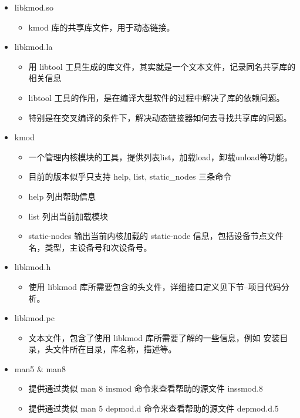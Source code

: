 \begin{itemize}
\item
  libkmod.so
  \begin{itemize}
  \item
    kmod 库的共享库文件，用于动态链接。
  \end{itemize}
\item
  libkmod.la
  \begin{itemize}
  \item
    用 libtool
    工具生成的库文件，其实就是一个文本文件，记录同名共享库的相关信息
  \item
    libtool 工具的作用，是在编译大型软件的过程中解决了库的依赖问题。
  \item
    特别是在交叉编译的条件下，解决动态链接器如何去寻找共享库的问题。
  \end{itemize}
\item
  kmod
  \begin{itemize}
  \item
    一个管理内核模块的工具，提供列表list，加载load，卸载unload等功能。
  \item
    目前的版本似乎只支持 help, list, static\_nodes 三条命令
  \item
    help 列出帮助信息
  \item
    list 列出当前加载模块
  \item
    static-nodes 输出当前内核加载的 static-node
    信息，包括设备节点文件名，类型，主设备号和次设备号。
  \end{itemize}
\item
  libkmod.h
  \begin{itemize}
  \item
    使用 libkmod 库所需要包含的头文件，详细接口定义见下节--项目代码分析。
  \end{itemize}
\item
  libkmod.pc
  \begin{itemize}
  \item
    文本文件，包含了使用 libkmod 库所需要了解的一些信息，例如
    安装目录，头文件所在目录，库名称，描述等。
  \end{itemize}
\item
  man5 \& man8
  \begin{itemize}
  \item
    提供通过类似 man 8 insmod 命令来查看帮助的源文件 inssmod.8
  \item
    提供通过类似 man 5 depmod.d 命令来查看帮助的源文件 depmod.d.5
  \end{itemize}
\end{itemize}
